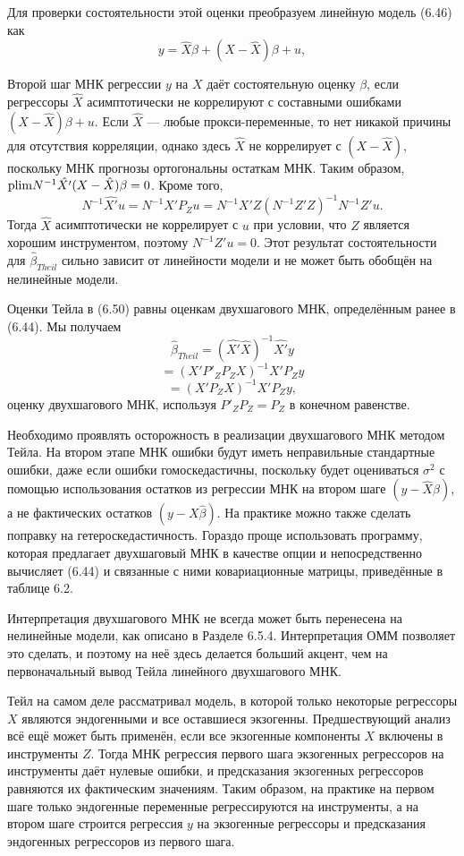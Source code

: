 Для проверки состоятельности этой оценки преобразуем линейную модель (6.46) как
\[
y= \hat{X} \beta+(X-\hat{X}) \beta + u,
\]

Второй шаг МНК регрессии $y$ на $X$ даёт состоятельную оценку $\beta$, если регрессоры $\hat{X}$ асимптотически не коррелируют с составными ошибками $(X-\hat{X}) \beta + u$. Если $\hat{X}$ --- любые прокси-переменные, то нет никакой причины для отсутствия корреляции, однако здесь $\hat{X}$ не коррелирует с $(X-\hat{X})$, поскольку МНК прогнозы ортогональны остаткам МНК. Таким образом, $\mathrm{plim } N^{-1} \hat{X'}(X-\hat{X})\beta=0$. Кроме того,
\[
N^{-1} \hat{X'} u= N^{-1} X' P_{Z} u = N^{-1} X' Z (N^{-1} Z' Z)^{-1} N^{-1} Z' u.
\]
Тогда $\hat{X}$ асимптотически не коррелирует с $u$ при условии, что $Z$ является хорошим инструментом, поэтому $N^{-1}Z'u=0$. Этот результат состоятельности для $\hat{\beta}_{Theil}$ сильно зависит от линейности модели и не может быть обобщён на нелинейные модели.

Оценки Тейла в (6.50) равны оценкам двухшагового МНК, определённым ранее в (6.44). Мы получаем
\[
\hat{\beta}_{Theil}=(\hat{X'}\hat{X})^{-1} \hat{X'}y
\]
\[
=(X' P'_{Z} P_{Z} X)^{-1} X' P_{Z} y 
\]
\[
=(X' P_{Z} X)^{-1} X' P_{Z} y, 
\]
оценку двухшагового МНК, используя $P'_{Z} P_{Z}=P_{Z}$ в конечном равенстве.

Необходимо проявлять осторожность в реализации двухшагового МНК методом Тейла. На втором этапе МНК ошибки будут иметь неправильные стандартные ошибки, даже если ошибки гомоскедастичны, поскольку будет оцениваться $\sigma^2$ с помощью использования остатков из регрессии МНК на втором шаге $(y-\hat{X} \hat{\beta})$, а не фактических остатков $(y- X \hat{\beta})$. На практике можно также сделать поправку на гетероскедастичность. Гораздо проще использовать программу, которая предлагает двухшаговый МНК в качестве опции и непосредственно вычисляет (6.44) и связанные с ними ковариационные матрицы, приведённые в таблице 6.2.

Интерпретация двухшагового МНК не всегда может быть перенесена на нелинейные модели, как описано в Разделе 6.5.4. Интерпретация ОММ позволяет это сделать, и поэтому на неё здесь делается больший акцент, чем на первоначальный вывод Тейла линейного двухшагового МНК.

Тейл на самом деле рассматривал модель, в которой только некоторые регрессоры $X$ являются эндогенными и все оставшиеся экзогенны. Предшествующий анализ всё ещё может быть применён, если все экзогенные компоненты $X$ включены в инструменты $Z$. Тогда МНК регрессия первого шага экзогенных регрессоров на инструменты даёт нулевые ошибки, и предсказания экзогенных регрессоров равняются их фактическим значениям. Таким образом, на практике на первом шаге только эндогенные переменные регрессируются на инструменты, а на втором шаге строится регрессия $y$ на экзогенные регрессоры и предсказания эндогенных регрессоров из первого шага.

